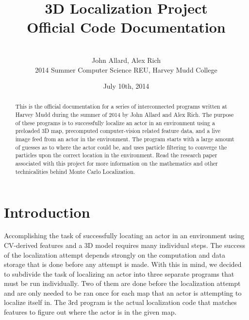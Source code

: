 \documentclass[a4paper,11pt]{article}
\title{3D Localization Project \\ Official Code Documentation}
\author{ \\[6.5in]  John Allard, Alex Rich \\ 2014 Summer Computer Science REU, Harvey Mudd College}
\date{July 10th, 2014}
\begin{document}
  \maketitle
  
  \newpage

    \begin{abstract}
    This is the official documentation for a series of interconnected programs written at Harvey Mudd during the summer of 2014 by John Allard and Alex Rich. The purpose of these programs is to successfully localize an actor in an environment using a preloaded 3D map, precomputed computer-vision related feature data, and a live image feed from an actor in the environment. The program starts with a large amount of guesses as to where the actor could be, and uses particle filtering to converge the particles upon the correct location in the environment. Read the research paper associated with this project for more information on the mathematics and other technicalities behind Monte Carlo Localization.
    \end{abstract}
    
    \tableofcontents
    \newpage

    \section{Introduction}
    Accomplishing the task of successfully locating an actor in an environment using CV-derived features and a 3D model requires many individual steps. The success 
    of the localization attempt depends strongly on the computation and data storage that is done before any attempt is made. With this in mind, we decided to subdivide the task of localizing an actor into three separate programs that must be run individually. Two of them are done before the localization attempt and are only needed to be ran once for each map that an actor is attempting to localize itself in. The 3rd program is the actual localization code that matches features to figure out where the actor is in the given map.
    
\end{document}
